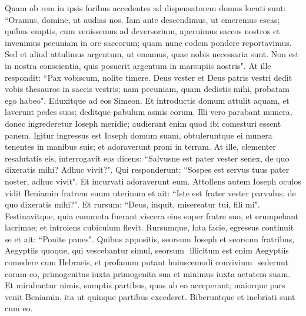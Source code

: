 \begin{biblechapter}
\verse Quam ob rem in ipsis foribus accedentes ad dispensatorem domus 
\verse locuti sunt: “Oramus, domine, ut audias nos. Iam ante descendimus, ut emeremus escas; 
\verse quibus emptis, cum venissemus ad deversorium, aperuimus saccos nostros et invenimus pecuniam in ore saccorum; quam nunc eodem pondere reportavimus. 
\verse Sed et aliud attulimus argentum, ut emamus, quae nobis necessaria sunt. Non est in nostra conscientia, quis posuerit argentum in marsupiis nostris". 
\verse At ille respondit: “Pax vobiscum, nolite timere. Deus vester et Deus patris vestri dedit vobis thesauros in saccis vestris; nam pecuniam, quam dedistis mihi, probatam ego habeo". Eduxitque ad eos Simeon. 
\verse Et introductis domum attulit aquam, et laverunt pedes suos; deditque pabulum asinis eorum. 
\verse Illi vero parabant munera, donec ingrederetur Ioseph meridie; audierant enim quod ibi comesturi essent panem. 
\verse Igitur ingressus est Ioseph domum suam, obtuleruntque ei munera tenentes in manibus suis; et adoraverunt proni in terram. 
\verse At ille, clementer resalutatis eis, interrogavit eos dicens: “Salvusne est pater vester senex, de quo dixeratis mihi? Adhuc vivit?". 
\verse Qui responderunt: “Sospes est servus tuus pater noster, adhuc vivit". Et incurvati adoraverunt eum. 
\verse Attollens autem Ioseph oculos vidit Beniamin fratrem suum uterinum et ait: “Iste est frater vester parvulus, de quo dixeratis mihi?". Et rursum: “Deus, inquit, misereatur tui, fili mi". 
\verse Festinavitque, quia commota fuerant viscera eius super fratre suo, et erumpebant lacrimae; et introiens cubiculum flevit. 
\verse Rursumque, lota facie, egressus continuit se et ait: “Ponite panes". 
\verse Quibus appositis, seorsum Ioseph et seorsum fratribus, Aegyptiis quoque, qui vescebantur simul, seorsum ­ illicitum est enim Aegyptiis comedere cum Hebraeis, et profanum putant huiuscemodi convivium ­ 
\verse sederunt coram eo, primogenitus iuxta primogenita sua et minimus iuxta aetatem suam. Et mirabantur nimis, 
\verse sumptis partibus, quas ab eo acceperant; maiorque pars venit Beniamin, ita ut quinque partibus excederet. Biberuntque et inebriati sunt cum eo. 
\end{biblechapter}

